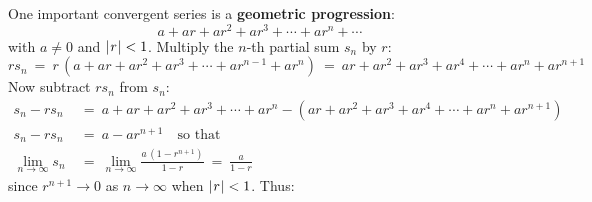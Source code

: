 
One important convergent series is a \textbf{geometric progression}:
\begin{equation}\label{eqn:geomprog}
a + ar + ar^2 + ar^3 + \cdots + ar^n + \cdots
\end{equation}
with $a \ne 0$ and $\lvert\mspace{1mu}r\mspace{1mu}\rvert < 1$. Multiply the $n$-th partial sum $s_n$ by $r$:
\[
rs_n ~=~ r\,(a + ar + ar^2 + ar^3 + \cdots + ar^{n-1} + ar^n) ~=~
ar + ar^2 + ar^3 + ar^4 + \cdots + ar^n + ar^{n+1}
\]
Now subtract $rs_n$ from $s_n$:
\begin{align*}
s_n - rs_n ~&=~ a + ar + ar^2 + ar^3 + \cdots + ar^n -
               (ar + ar^2 + ar^3 + ar^4 + \cdots + ar^n + ar^{n+1})\\
s_n - rs_n ~&=~ a - ar^{n+1} \quad\text{so that}\\
\lim_{n \to \infty} s_n ~&=~ \lim_{n \to \infty} \frac{a\,(1 - r^{n+1})}{1 -r} ~=~ \frac{a}{1-r}
\end{align*}
since $r^{n+1} \rightarrow 0$ as $n \to \infty$ when $\lvert\mspace{1mu}r\mspace{1mu}\rvert < 1$. Thus:

